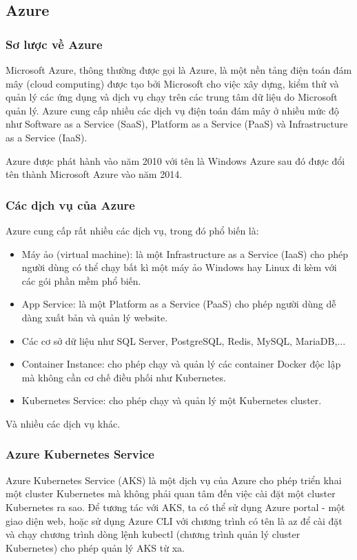 \subsection{Azure}
\subsubsection{Sơ lược về Azure}
Microsoft Azure, thông thường được gọi là Azure, là một nền
tảng điện toán đám mây (cloud computing) được tạo bởi Microsoft
cho việc xây dựng, kiểm thử và quản lý các ứng dụng và dịch vụ
chạy trên các trung tâm dữ liệu do Microsoft quản lý. Azure
cung cấp nhiều các dịch vụ điện toán đám mây ở nhiều mức độ như
Software as a Service (SaaS), Platform as a Service (PaaS)
và Infrastructure as a Service (IaaS). 

Azure được phát hành vào năm 2010 với tên là Windows Azure sau
đó được đổi tên thành Microsoft Azure vào năm 2014. 

\subsubsection{Các dịch vụ của Azure}
Azure cung cấp rất nhiều các dịch vụ, trong đó phổ biến là:
\begin{itemize}[topsep=0ex]
\item Máy ảo (virtual machine): là một Infrastructure as a Service
(IaaS) cho phép người dùng có thể chạy bất kì một máy ảo Windows
hay Linux đi kèm với các gói phần mềm phổ biến.

\item App Service: là một Platform as a Service (PaaS) cho phép
người dùng dễ dàng xuất bản và quản lý website.

\item Các cơ sở dữ liệu như SQL Server, PostgreSQL, Redis,
MySQL, MariaDB,...

\item Container Instance: cho phép chạy và quản lý các container
Docker độc lập mà không cần cơ chế điều phối như Kubernetes.

\item Kubernetes Service: cho phép chạy và quản lý một
Kubernetes cluster.
\end{itemize}
Và nhiều các dịch vụ khác.

\subsubsection{Azure Kubernetes Service}
Azure Kubernetes Service (AKS) là một dịch vụ của Azure cho phép triển
khai một cluster Kubernetes mà không phải quan tâm đến việc cài đặt một
cluster Kubernetes ra sao. Để tương tác với AKS, ta có thể sử dụng
Azure portal - một giao diện web, hoặc sử dụng Azure CLI với
chương trình có tên là az để cài đặt và chạy chương trình dòng
lệnh kubectl (chương trình quản lý cluster Kubernetes) cho phép
quản lý AKS từ xa. 
